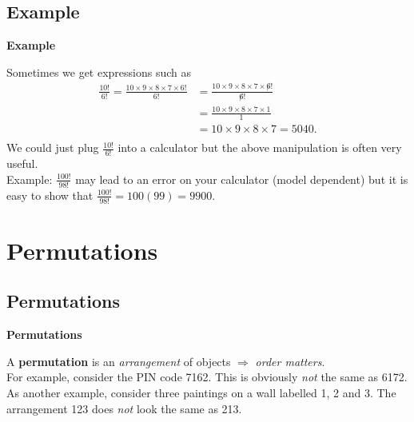 \documentclass[compress]{beamer}        %
\makeatletter
\newcommand{\tcb}{\textcolor{beamer@blendedblue}}
\makeatother
\begin{document}
\subsection{Example}
\begin{frame}{\bf \tcb{Example}}

Sometimes we get expressions such as\\[-0.1cm]
\begin{align*}
\frac{10!}{6!} = \frac{10\times9\times8\times7\times6!}{6!} &= \frac{10\times9\times8\times7\times \not6!}{\not6!} \\
&= \frac{10\times9\times8\times7\times 1}{1} \\
&= 10\times9\times8\times7 = 5040.\\[-0.3cm]
\end{align*}
We could just plug $\frac{10!}{6!}$ into a calculator but the above manipulation is often very useful.\\[0.6cm]

Example: $\frac{100!}{98!}$ may lead to an error on your calculator (model dependent) but it is easy to show that $\frac{100!}{98!} = 100(99) = 9900$.


\end{frame}







\section{Permutations}
\subsection{Permutations}
\begin{frame}{\bf \tcb{Permutations}}

A {\bf permutation} is an \emph{arrangement} of objects $\Rightarrow$ \emph{order matters}.\\[1cm]

For example, consider the PIN code 7162. This is obviously \emph{not} the same as 6172.\\[1cm]

As another example, consider three paintings on a wall labelled 1, 2 and 3. The arrangement 123 does \emph{not} look the same as 213.\\
{\footnotesize\phantom{w}}

\end{frame}
\end{document}
